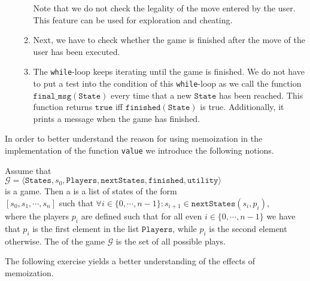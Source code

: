 \begin{enumerate}
\begin{enumerate}
            Note that we do not check the legality of the move entered by the user.  This feature can be used
            for exploration and cheating.
      \item Next, we have to check whether the game is finished after the  move of the user has been executed.
      \item The \texttt{while}-loop keeps iterating until the game is finished.
            We do not have to put a test into the condition of this \texttt{while}-loop as we call the function
            $\texttt{final\_msg}(\texttt{State})$ every time that a new $\texttt{State}$ has been reached.
            This function returns $\texttt{true}$ iff $\texttt{finished}(\texttt{State})$ is true.
            Additionally, it prints a message when the game has finished.
      \end{enumerate}
\end{enumerate}
In order to better understand the reason for using memoization in the implementation of the function
\texttt{value} we introduce the following notions.
\begin{Definition}
  Assume that
  \\[0.2cm]
  \hspace*{1.3cm}
  $\mathcal{G} = \langle \texttt{States}, s_0, \texttt{Players}, \texttt{nextStates}, \texttt{finished},\texttt{utility} \rangle$
  \\[0.2cm]
  is a game. Then a  is a list of states of the form 
  \\[0.2cm]
  \hspace*{1.3cm}
  $[s_0, s_1, \cdots, s_n]$ \quad such that \quad $\forall i\in\{0,\cdots,n-1\}: s_{i+1} \in \texttt{nextStates}(s_i, p_i)$,
  \\[0.2cm]
  where the players $p_i$ are defined such that for all even $i\in\{0,\cdots,n-1\}$ we have that $p_i$ is the
  first element in the list $\texttt{Players}$, while $p_i$ is the second element otherwise.
  The  of the game $\mathcal{G}$ is the set of all possible plays.  \eoxs
\end{Definition}

\noindent
The following exercise yields a better understanding of the effects of memoization.

